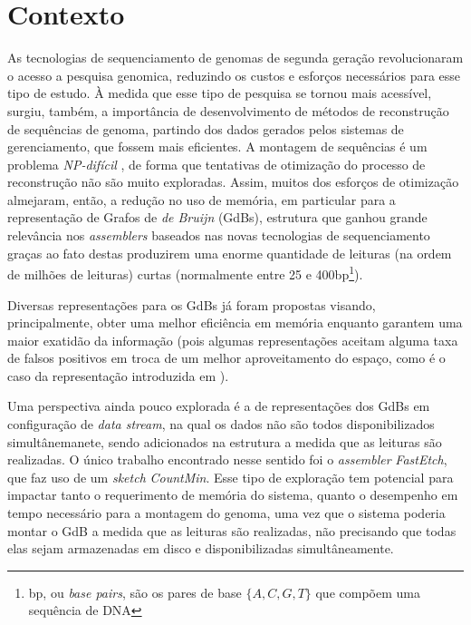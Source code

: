 \section{Contexto}

As tecnologias de sequenciamento de genomas de segunda geração revolucionaram
o acesso a pesquisa genomica, reduzindo os custos e esforços necessários para
esse tipo de estudo\cite{Imelfort2009}. À medida que esse
tipo de pesquisa se tornou mais acessível, surgiu, também, a importância de 
desenvolvimento de métodos de reconstrução de sequências de genoma, partindo
dos dados gerados pelos sistemas de gerenciamento, que fossem mais eficientes.
A montagem de sequências é um problema \emph{NP-difícil}
\cite{Medvev2007}, de forma que tentativas de otimização do processo de reconstrução
não são muito exploradas. Assim, muitos dos esforços de otimização almejaram, então, a
redução no uso de memória, em particular para a representação de Grafos de \emph{de Bruijn} (GdBs), 
estrutura que ganhou grande relevância nos \emph{assemblers} baseados nas novas
tecnologias de sequenciamento\cite{Conway2011}\cite{Chikhi2014} graças ao fato destas
produzirem uma enorme quantidade de leituras (na ordem de milhões de leituras)
curtas (normalmente entre 25 e 400bp\footnote{bp, ou \emph{base pairs}, são os
pares de base $\{A, C, G, T\}$ que compõem uma sequência de DNA}).

Diversas representações para os GdBs já foram propostas\cite{Chikhi2014} visando, principalmente,
obter uma melhor eficiência em memória enquanto garantem uma maior exatidão da informação
(pois algumas representações aceitam alguma taxa de falsos positivos em troca de
um melhor aproveitamento do espaço, como é o caso da representação introduzida em
\cite{Pell13272}).

Uma perspectiva ainda pouco explorada é a de representações dos GdBs em configuração
de \emph{data stream}, na qual os dados não são todos disponibilizados simultânemanete,
sendo adicionados na estrutura a medida que as leituras são realizadas. O único
trabalho encontrado nesse sentido foi o \emph{assembler} \emph{FastEtch}\cite{Ghosh2016},
que faz uso de um \emph{sketch} \emph{CountMin}. Esse tipo de
exploração tem potencial para impactar tanto o requerimento de memória do sistema, quanto
o desempenho em tempo necessário para a montagem do genoma, uma vez que o sistema poderia
montar o GdB a medida que as leituras são realizadas, não precisando que todas
elas sejam armazenadas em disco e disponibilizadas simultâneamente.